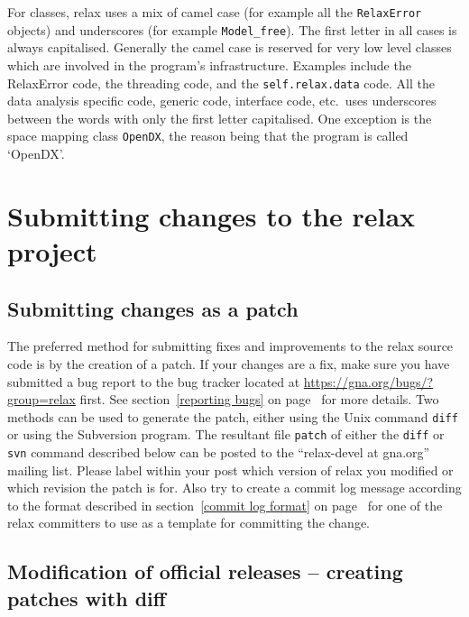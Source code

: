 For classes, relax uses a mix of camel case (for example all the \texttt{RelaxError} objects) and underscores (for example \texttt{Model\_free}).  The first letter in all cases is always capitalised.  Generally the camel case is reserved for very low level classes which are involved in the program's infrastructure.  Examples include the RelaxError code, the threading code, and the \texttt{self.relax.data} code.  All the data analysis specific code, generic code, interface code, etc.\ uses underscores between the words with only the first letter capitalised.  One exception is the space mapping class \texttt{OpenDX}, the reason being that the program is called `OpenDX'.




\section{Submitting changes to the relax project}


\subsection{Submitting changes as a patch}

The preferred method for submitting fixes and improvements to the relax source code is by the creation of a patch.  If your changes are a fix, make sure you have submitted a bug report to the bug tracker located at \href{https://gna.org/bugs/?group=relax}{https://gna.org/bugs/?group=relax} first.  See section~\ref{reporting bugs} on page~\pageref{reporting bugs} for more details.  Two methods can be used to generate the patch, either using the Unix command \texttt{diff} or using the Subversion program.  The resultant file \texttt{patch} of either the \texttt{diff} or \texttt{svn} command described below can be posted to the ``relax-devel at gna.org'' mailing list.  Please label within your post which version of relax you modified or which revision the patch is for.  Also try to create a commit log message according to the format described in section~\ref{commit log format} on page~\pageref{commit log format} for one of the relax committers to use as a template for committing the change.


\subsection{Modification of official releases -- creating patches with diff}

